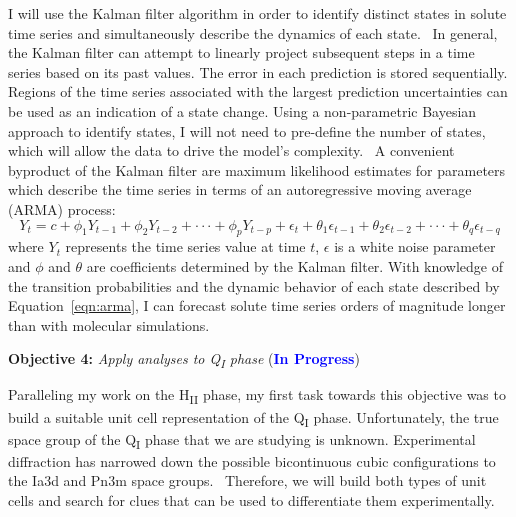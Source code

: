\documentclass{article}
\begin{document}
  I will use the Kalman filter algorithm in order to identify distinct states
  in solute time series and simultaneously describe the dynamics of each state.~\cite{kalman_new_1960}
  In general, the Kalman filter can attempt to linearly project subsequent 
  steps in a time series based on its past values. The error in each prediction
  is stored sequentially. Regions of the time series associated with the 
  largest prediction uncertainties can be used as an indication of a state change.
  Using a non-parametric Bayesian approach to identify states, I will not need to 
  pre-define the number of states, which will allow the data to drive the
  model's complexity.~\cite{lee_unraveling_2017} A convenient byproduct of the Kalman
  filter are maximum likelihood estimates for parameters which describe the time
  series in terms of an autoregressive moving average (ARMA) process:~\cite{hamilton_time_1994}
  \begin{equation}
  Y_t = c + \phi_1 Y_{t-1} + \phi_2 Y_{t-2} + \cdot\cdot\cdot + \phi_p Y_{t-p} + \epsilon_t + \theta_1\epsilon_{t-1} + \theta_2\epsilon_{t-2} + \cdot\cdot\cdot + \theta_q\epsilon_{t-q}
  \label{eqn:arma}
  \end{equation}
  where $Y_t$ represents the time series value at time $t$, $\epsilon$ is a white noise
  parameter and $\phi$ and $\theta$ are coefficients determined by the Kalman filter. 
  With knowledge of the transition probabilities and the dynamic behavior of each
  state described by Equation~\ref{eqn:arma}, I can forecast solute time series orders of 
  magnitude longer than with molecular simulations.
  
  \noindent \textbf{\large Objective 4:} \textit{\large Apply analyses to 
  Q\textsubscript{I} phase} (\textcolor{blue}{\textbf{In Progress}})
  
  Paralleling my work on the H\textsubscript{II} phase, my first task towards
  this objective was to build a suitable unit cell representation of the 
  Q\textsubscript{I} phase. Unfortunately, the true space group of the 
  Q\textsubscript{I} phase that we are studying is unknown. Experimental 
  diffraction has narrowed down the possible bicontinuous cubic 
  configurations to the Ia3d and Pn3m space groups.~\cite{pindzola_cross-linked_2003}
  Therefore, we will build both types of unit cells and search for clues that
  can be used to differentiate them experimentally.
  
\end{document}
